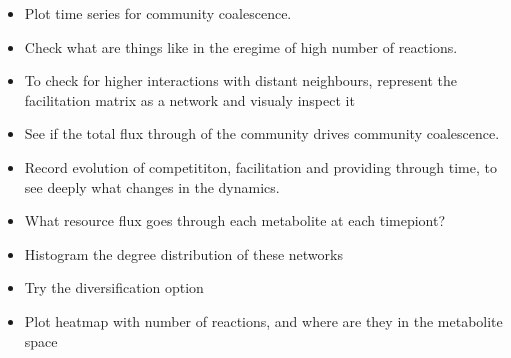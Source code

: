 \documentclass[10pt,letterpaper]{article}
\begin{document}
		    \begin{itemize}
				\item Plot time series for community coalescence.                          
				\item Check what are things like in the eregime of high number of reactions.
				\item To check for higher interactions with distant neighbours, represent the facilitation matrix as a network and visualy inspect it
				\item See if the total flux through of the community drives community coalescence.
				\item Record evolution of competititon, facilitation and providing through time, to see deeply what changes in the dynamics.
				\item What resource flux goes through each metabolite at each timepiont?   
				\item Histogram the degree distribution of these networks                  
				\item Try the diversification option                                       
				\item Plot heatmap with number of reactions, and where are they in the metabolite space
		    \end{itemize}

	
	
		
		
\end{document}

